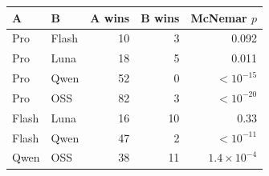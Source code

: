 \begin{tabular}{llrrr}
\toprule
\textbf{A} & \textbf{B} & \textbf{A wins} & \textbf{B wins} & \textbf{McNemar $p$} \\
\midrule
Pro & Flash & 10 & 3 & 0.092 \\
Pro & Luna & 18 & 5 & 0.011 \\
Pro & Qwen & 52 & 0 & $<10^{-15}$ \\
Pro & OSS & 82 & 3 & $<10^{-20}$ \\
Flash & Luna & 16 & 10 & 0.33 \\
Flash & Qwen & 47 & 2 & $<10^{-11}$ \\
Qwen & OSS & 38 & 11 & $1.4\times10^{-4}$ \\
\bottomrule
\end{tabular}
